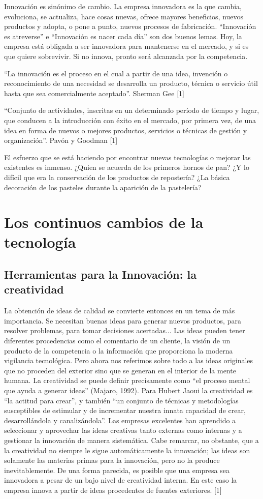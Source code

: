 \documentclass{bmcart}
\begin{document}
Innovación es sinónimo de cambio. La empresa innovadora es la que cambia, evoluciona, se actualiza, hace cosas nuevas, ofrece mayores beneficios, nuevos productos y adopta, o pone a punto, nuevos procesos de fabricación. “Innovación es atreverse” e “Innovación es nacer cada día” son dos buenos lemas. Hoy, la empresa está obligada a ser innovadora para mantenerse en el mercado, y si es que quiere sobrevivir. Si no innova, pronto será alcanzada por la competencia.

“La innovación es el proceso en el cual a partir de una idea, invención o reconocimiento de una necesidad se desarrolla un producto, técnica o servicio útil hasta que sea comercialmente aceptado”. Sherman Gee [1]

“Conjunto de actividades, inscritas en un determinado período de tiempo y lugar, que conducen a la introducción con éxito en el mercado, por primera vez, de una idea en forma de nuevos o mejores productos, servicios o técnicas de gestión y organización”. Pavón y Goodman [1]

El esfuerzo que se está haciendo por encontrar nuevas tecnologías o mejorar las existentes es inmenso. ¿Quien se acuerda de los primeros hornos de pan? ¿Y lo difícil que era la conservación de los productos de repostería? ¿La básica decoración de los pasteles durante la aparición de la pastelería? 


\section{Los continuos cambios de la tecnología}
\subsection{Herramientas para la Innovación: la creatividad
}

La obtención de ideas de calidad se convierte entonces en un tema de más importancia. Se necesitan buenas ideas para generar nuevos productos, para resolver problemas, para tomar decisiones acertadas... Las ideas pueden tener diferentes procedencias como el comentario de un cliente, la visión de un producto de la competencia o la información que proporciona la moderna vigilancia tecnológica. Pero ahora nos referimos sobre todo a las ideas originales que no proceden del exterior sino que se generan en el interior de la mente humana. La creatividad se puede definir precisamente como “el proceso mental que ayuda a generar ideas” (Majaro, 1992). Para Hubert Jaoui la creatividad es “la actitud para crear”, y también “un conjunto de técnicas y metodologías susceptibles de estimular y de incrementar nuestra innata capacidad de crear, desarrollándola y canalizándola”.
Las empresas excelentes han aprendido a seleccionar y aprovechar las ideas creativas tanto externas como internas y a gestionar la innovación de manera sistemática. Cabe remarcar, no obstante, que a la creatividad no siempre le sigue automáticamente la innovación; las ideas son solamente las materias primas para la innovación, pero no la produce inevitablemente. De una forma parecida, es posible que una empresa sea innovadora a pesar de un bajo nivel de creatividad interna. En este caso la empresa innova a partir de ideas procedentes de fuentes exteriores. [1]
\end{document}
